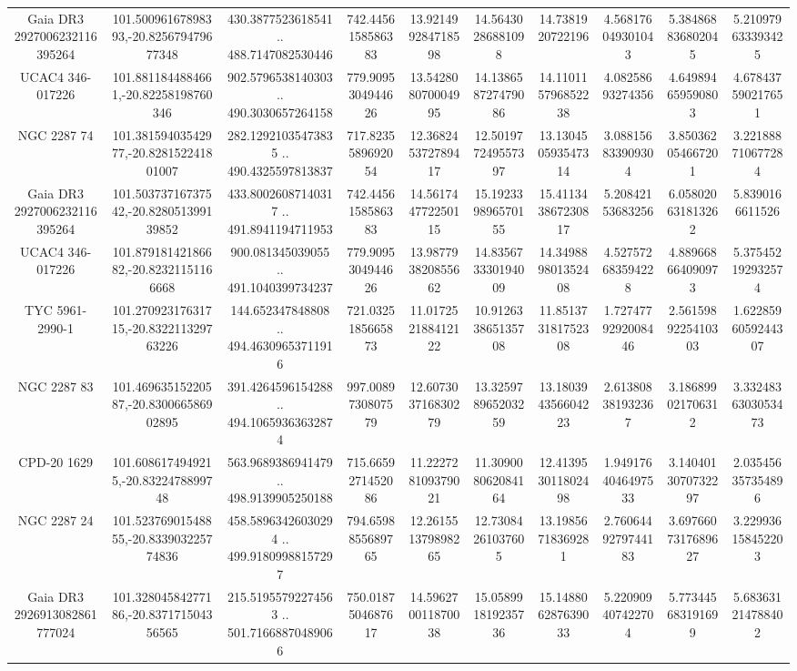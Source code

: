 \begin{table}
\begin{tabular}{cccccccccc}
Gaia DR3 2927006232116395264 & 101.50096167898393,-20.825679479677348 & 430.3877523618541 .. 488.7147082530446 & 742.4456158586383 & 13.921499284718598 & 14.56430286881098 & 14.7381920722196 & 4.568176049301043 & 5.384868836802045 & 5.210979633393425 \\
UCAC4 346-017226 & 101.8811844884661,-20.82258198760346 & 902.5796538140303 .. 490.3030657264158 & 779.9095304944626 & 13.542808070004995 & 14.138658727479086 & 14.110115796852238 & 4.08258693274356 & 4.649894659590803 & 4.678437590217651 \\
NGC  2287    74 & 101.38159403542977,-20.828152241801007 & 282.12921035473835 .. 490.4325597813837 & 717.8235589692054 & 12.368245372789417 & 12.501977249557397 & 13.130450593547314 & 3.088156833909304 & 3.850362054667201 & 3.221888710677284 \\
Gaia DR3 2927006232116395264 & 101.50373716737542,-20.828051399139852 & 433.80026087140317 .. 491.8941194711953 & 742.4456158586383 & 14.561744772250115 & 15.192339896570155 & 15.411343867230817 & 5.20842153683256 & 6.058020631813262 & 5.8390166611526 \\
UCAC4 346-017226 & 101.87918142186682,-20.82321151166668 & 900.081345039055 .. 491.1040399734237 & 779.9095304944626 & 13.987793820855662 & 14.835673330194009 & 14.349889801352408 & 4.527572683594228 & 4.889668664090973 & 5.375452192932574 \\
TYC 5961-2990-1 & 101.27092317631715,-20.832211329763226 & 144.652347848808 .. 494.46309653711916 & 721.0325185665873 & 11.017252188412122 & 10.912633865135708 & 11.851373181752308 & 1.7274779292008446 & 2.5615989225410303 & 1.6228596059244307 \\
NGC  2287    83 & 101.46963515220587,-20.830066586902895 & 391.4264596154288 .. 494.10659363632874 & 997.0089730807579 & 12.607303716830279 & 13.325978965203259 & 13.180394356604223 & 2.613808381932367 & 3.186899021706312 & 3.3324836303053473 \\
CPD-20  1629 & 101.6086174949215,-20.8322478899748 & 563.9689386941479 .. 498.9139905250188 & 715.6659271452086 & 11.222728109379021 & 11.309008062084164 & 12.413953011802498 & 1.9491764046497533 & 3.1404013070732297 & 2.035456357354896 \\
NGC  2287    24 & 101.52376901548855,-20.833903225774836 & 458.58963426030294 .. 499.91809988157297 & 794.6598855689765 & 12.261551379898265 & 12.73084261037605 & 13.19856718369281 & 2.7606449279744183 & 3.6976607317689627 & 3.229936158452203 \\
Gaia DR3 2926913082861777024 & 101.32804584277186,-20.837171504356565 & 215.51955792274563 .. 501.71668870489066 & 750.0187504687617 & 14.596270011870038 & 15.058991819235736 & 15.148806287639033 & 5.220909407422704 & 5.773445683191699 & 5.683631214788402 \\

\end{tabular}
\end{table}
